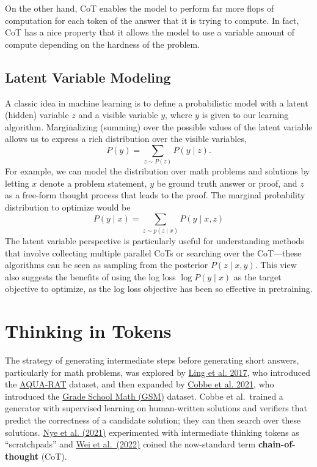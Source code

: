 \documentclass[12pt]{article}
\begin{document}
On the other hand, CoT enables the model to perform far more flops of computation for each token of the answer that it is trying to compute. In fact, CoT has a nice property that it allows the model to use a variable amount of compute depending on the hardness of the problem.

\subsection{Latent Variable Modeling}

A classic idea in machine learning is to define a probabilistic model with a latent (hidden) variable $z$ and a visible variable $y$, where $y$ is given to our learning algorithm. Marginalizing (summing) over the possible values of the latent variable allows us to express a rich distribution over the visible variables,
\[
P(y) = \sum_{z \sim P(z)} P(y \mid z).
\]
For example, we can model the distribution over math problems and solutions by letting $x$ denote a problem statement, $y$ be ground truth answer or proof, and $z$ as a free-form thought process that leads to the proof. The marginal probability distribution to optimize would be
\[
P(y \mid x) = \sum_{z \sim p(z\mid x)} P(y \mid x, z)
\]
The latent variable perspective is particularly useful for understanding methods that involve collecting multiple parallel CoTs or searching over the CoT---these algorithms can be seen as sampling from the posterior $P(z \mid x, y)$. This view also suggests the benefits of using the log loss $\log P(y \mid x)$ as the target objective to optimize, as the log loss objective has been so effective in pretraining.

\section{Thinking in Tokens}

The strategy of generating intermediate steps before generating short answers, particularly for math problems, was explored by \href{https://arxiv.org/abs/1705.04146}{Ling et al. 2017}, who introduced the \href{https://github.com/google-deepmind/AQuA}{AQUA-RAT} dataset, and then expanded by \href{https://arxiv.org/abs/2110.14168}{Cobbe et al. 2021}, who introduced the \href{https://github.com/openai/grade-school-math}{Grade School Math (GSM)} dataset. Cobbe et al.\ trained a generator with supervised learning on human-written solutions and verifiers that predict the correctness of a candidate solution; they can then search over these solutions. \href{https://arxiv.org/abs/2112.00114}{Nye et al. (2021)} experimented with intermediate thinking tokens as ``scratchpads'' and \href{https://arxiv.org/abs/2201.11903}{Wei et al.\ (2022)} coined the now-standard term \textbf{chain-of-thought} (CoT).
\end{document}

